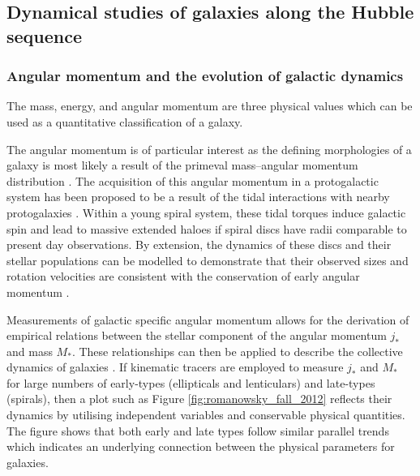 \documentclass[12pt, twocolumn]{revtex4-1}    %
\begin{document}
\vspace{2ex} %
\subsection{Dynamical studies of galaxies along the Hubble sequence}
\subsubsection{Angular momentum and the evolution of galactic dynamics}
\noindent
The mass, energy, and angular momentum are three physical values which can be used as a quantitative classification of a galaxy. 

The angular momentum is of particular interest as the defining morphologies of a galaxy is most likely a result of the primeval mass--angular momentum distribution \citep{1970ApJ...160..831S}. The acquisition of this angular momentum in a protogalactic system has been proposed to be a result of the tidal interactions with nearby protogalaxies \citep{1969ApJ...155..393P}. Within a young spiral system, these tidal torques induce galactic spin and lead to massive extended haloes if spiral discs have radii comparable to present day observations. By extension, the dynamics of these discs and their stellar populations can be modelled to demonstrate that their observed sizes and rotation velocities are consistent with the conservation of early angular momentum \citep{1998MNRAS.295..319M, 1997ApJ...482..659D}. 

Measurements of galactic specific angular momentum allows for the derivation of empirical relations between the stellar component of the angular momentum $j_*$ and mass $M_*$. These relationships can then be applied to describe the collective dynamics of galaxies \citep{fall1983}. If kinematic tracers are employed to measure $j_*$ and $M_*$ for large numbers of early-types (ellipticals and lenticulars) and late-types (spirals), then a plot such as Figure \ref{fig:romanowsky_fall_2012} reflects their dynamics by utilising independent variables and conservable physical quantities. The figure shows that both early and late types follow similar parallel trends which indicates an underlying connection between the physical parameters for galaxies. 
\end{document}

